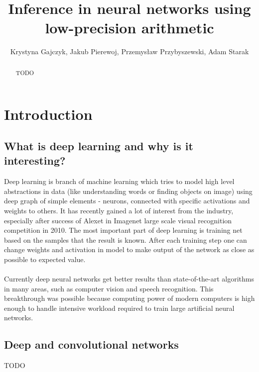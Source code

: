 \documentclass[licencjacka]{pracamgr}
\title{Inference in neural networks using low-precision arithmetic}
\author{Krystyna Gajczyk, Jakub Pierewoj, Przemysław Przybyszewski, Adam Starak}
\begin{document}
\maketitle
\begin{abstract}
TODO
\end{abstract}

\tableofcontents

\chapter{Introduction}

	\section{What is deep learning and why is it interesting?}

	Deep learning is branch of machine learning which tries to model high level abstractions in data (like understanding words or finding objects on image) using deep graph of simple elements - neurons, connected with specific activations and weights to others. It has recently gained a lot of interest from the industry, especially after success of Alexet in Imagenet large scale visual recognition competition in 2010.
	The most important part of deep learning is training net based on the samples that the result is known. After each training step one can change weights and activation in model to make output of the network as close as possible to expected value.
	\\\\
	Currently deep neural networks get better results than state-of-the-art algorithms in many areas, such as computer vision and speech recognition. This breakthrough was possible because computing power of modern computers is high enough to handle intensive workload required to train large artificial neural networks.

	\section{Deep and convolutional networks}
		TODO
	\\\\
\end{document}
